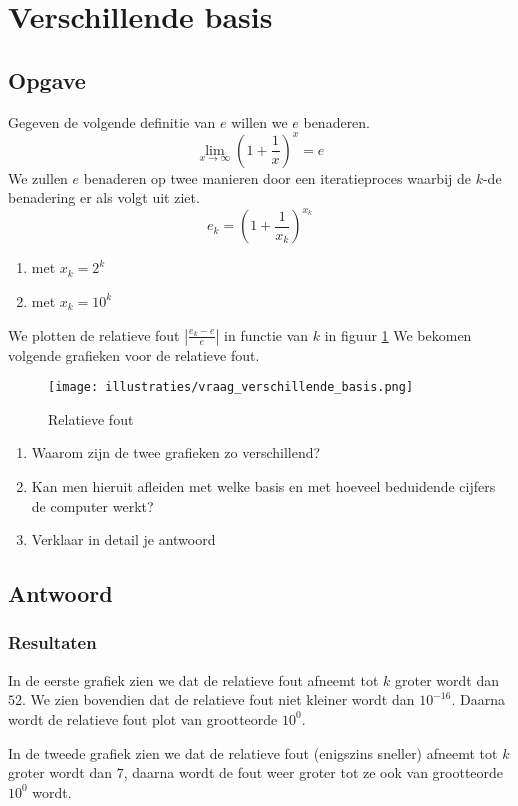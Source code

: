 \documentclass[examenvragen.tex]{subfiles}
\begin{document}
\section{Verschillende basis}

\subsection{Opgave}
Gegeven de volgende definitie van $e$ willen we $e$ benaderen.
\[
\lim_{x\rightarrow\infty}\left(1+\frac{1}{x}\right)^x = e
\]
We zullen $e$ benaderen op twee manieren door een iteratieproces waarbij de $k$-de benadering er als volgt uit ziet.
\[
e_{k} = \left(1+\frac{1}{x_k}\right)^{x_k}
\]
\begin{enumerate}
\item met $x_{k} = 2^k$
\item met $x_{k} = 10^k$
\end{enumerate}
We plotten de relatieve fout $\left| \frac{e_k - e}{e} \right|$ in functie van $k$ in figuur \ref{fig:vraag_verschillende_basis:rel_err}
We bekomen volgende grafieken voor de relatieve fout.
\begin{figure}[H]
\centering
\texttt{[image: illustraties/vraag\_verschillende\_basis.png]}
\caption{Relatieve fout}
\label{fig:vraag_verschillende_basis:rel_err}
\end{figure}

\begin{enumerate}
\item Waarom zijn de twee grafieken zo verschillend?
\item Kan men hieruit afleiden met welke basis en met hoeveel beduidende cijfers de computer werkt?
\item Verklaar in detail je antwoord
\end{enumerate}

\subsection{Antwoord}
\subsubsection{Resultaten}
In de eerste grafiek zien we dat de relatieve fout afneemt tot $k$ groter wordt dan $52$. We zien bovendien dat de relatieve fout niet kleiner wordt dan $10^{-16}$. Daarna wordt de relatieve fout plot van grootteorde $10^{0}$.

In de tweede grafiek zien we dat de relatieve fout (enigszins sneller) afneemt tot $k$ groter wordt dan $7$, daarna wordt de fout weer groter tot ze ook van grootteorde $10^{0}$ wordt.
\end{document}
